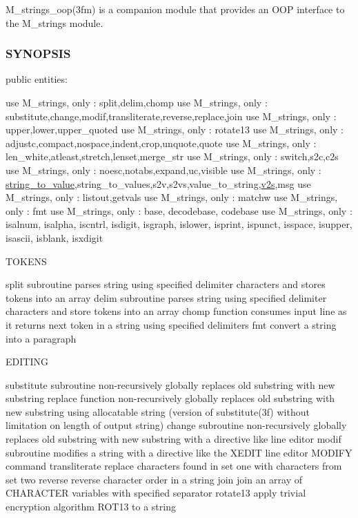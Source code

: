 M\+\_\+strings\+\_\+oop(3fm) is a companion module that provides an O\+OP interface to the M\+\_\+strings module.

\subsubsection*{S\+Y\+N\+O\+P\+S\+IS}

public entities\+:

use M\+\_\+strings, only \+: split,delim,chomp use M\+\_\+strings, only \+: substitute,change,modif,transliterate,reverse,replace,join use M\+\_\+strings, only \+: upper,lower,upper\+\_\+quoted use M\+\_\+strings, only \+: rotate13 use M\+\_\+strings, only \+: adjustc,compact,nospace,indent,crop,unquote,quote use M\+\_\+strings, only \+: len\+\_\+white,atleast,stretch,lenset,merge\+\_\+str use M\+\_\+strings, only \+: switch,s2c,c2s use M\+\_\+strings, only \+: noesc,notabs,expand,uc,visible use M\+\_\+strings, only \+: \mbox{\hyperlink{interfacem__strings_1_1string__to__value}{string\+\_\+to\+\_\+value}},string\+\_\+to\+\_\+values,s2v,s2vs,value\+\_\+to\+\_\+string,\mbox{\hyperlink{interfacem__strings_1_1v2s}{v2s}},msg use M\+\_\+strings, only \+: listout,getvals use M\+\_\+strings, only \+: matchw use M\+\_\+strings, only \+: fmt use M\+\_\+strings, only \+: base, decodebase, codebase use M\+\_\+strings, only \+: isalnum, isalpha, iscntrl, isdigit, isgraph, islower, isprint, ispunct, isspace, isupper, isascii, isblank, isxdigit

T\+O\+K\+E\+NS

split subroutine parses string using specified delimiter characters and stores tokens into an array delim subroutine parses string using specified delimiter characters and store tokens into an array chomp function consumes input line as it returns next token in a string using specified delimiters fmt convert a string into a paragraph

E\+D\+I\+T\+I\+NG

substitute subroutine non-\/recursively globally replaces old substring with new substring replace function non-\/recursively globally replaces old substring with new substring using allocatable string (version of substitute(3f) without limitation on length of output string) change subroutine non-\/recursively globally replaces old substring with new substring with a directive like line editor modif subroutine modifies a string with a directive like the X\+E\+D\+IT line editor M\+O\+D\+I\+FY command transliterate replace characters found in set one with characters from set two reverse reverse character order in a string join join an array of C\+H\+A\+R\+A\+C\+T\+ER variables with specified separator rotate13 apply trivial encryption algorithm R\+O\+T13 to a string

